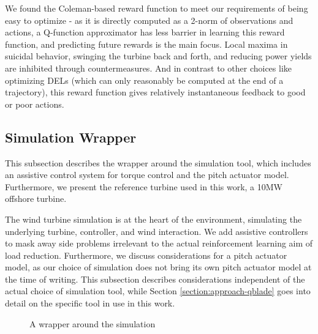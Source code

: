 We found the Coleman-based reward function to meet our requirements of being easy to optimize - as it is directly computed as a 2-norm of observations and actions, a Q-function approximator has less barrier in learning this reward function, and predicting future rewards is the main focus. Local maxima in suicidal behavior, swinging the turbine back and forth, and reducing power yields are inhibited through countermeasures. And in contrast to other choices like optimizing \acp{DEL} (which can only reasonably be computed at the end of a trajectory), this reward function gives relatively instantaneous feedback to good or poor actions. 


\subsection{Simulation Wrapper}
\label{section:approach-simulation}

\begin{summary}
This subsection describes the wrapper around the simulation tool, which includes an assistive control system for torque control and the pitch actuator model. Furthermore, we present the reference turbine used in this work, a 10MW offshore turbine.
\end{summary}

The wind turbine simulation is at the heart of the environment, simulating the underlying turbine, controller, and wind interaction. We add assistive controllers to mask away side problems irrelevant to the actual reinforcement learning aim of load reduction. Furthermore, we discuss considerations for a pitch actuator model, as our choice of simulation does not bring its own pitch actuator model at the time of writing. This subsection describes considerations independent of the actual choice of simulation tool, while Section \ref{section:approach-qblade} goes into detail on the specific tool in use in this work.

\begin{figure}
  \centering

  \caption{A wrapper around the simulation}
  \label{fig:simulation-wrapper}
\end{figure}


